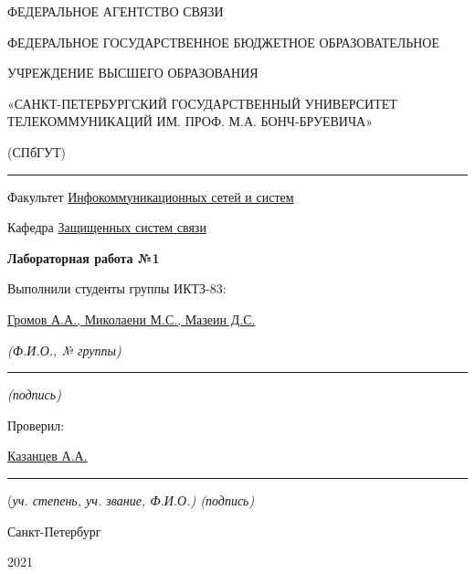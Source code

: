 \documentclass[a4paper,14pt]{extarticle}
\begin{document}
    \begin{center}
        \thispagestyle{empty}
        \begin{singlespace}
        ФЕДЕРАЛЬНОЕ АГЕНТСТВО СВЯЗИ

        ФЕДЕРАЛЬНОЕ ГОСУДАРСТВЕННОЕ БЮДЖЕТНОЕ ОБРАЗОВАТЕЛЬНОЕ

        УЧРЕЖДЕНИЕ ВЫСШЕГО ОБРАЗОВАНИЯ

        «САНКТ-ПЕТЕРБУРГСКИЙ ГОСУДАРСТВЕННЫЙ УНИВЕРСИТЕТ ТЕЛЕКОММУНИКАЦИЙ ИМ. ПРОФ. М.А. БОНЧ-БРУЕВИЧА»

        (СПбГУТ)
        \end{singlespace}
        \vspace{-1ex}
        \rule{\textwidth}{0.4pt}
        \vspace{-5ex}

        Факультет \underline{Инфокоммуникационных сетей и систем}

        Кафедра \underline{Защищенных систем связи}
        \vspace{10ex}

        \textbf{Лабораторная работа №1}\\
        


    \end{center}
    \vspace{4ex}
    \begin{flushright}
    \parbox{10 cm}{
    \begin{flushleft}
        Выполнили студенты группы ИКТЗ-83:

        \underline{Громов А.А., Миколаени М.С., Мазеин Д.С.} \hfill 

        \footnotesize \textit{ (Ф.И.О., № группы)} \hfill \rule[-0.85ex]{0.1\textwidth}{0.6pt}
        
        \hfill \textit{(подпись)} \normalsize

        Проверил:

        \underline{Казанцев А.А.} \hfill \rule[-0.85ex]{0.1\textwidth}{0.6pt}

        (\footnotesize \textit{уч. степень, уч. звание, Ф.И.О.) \hfill (подпись)} \normalsize

    \end{flushleft}
    }
    \end{flushright}
    \begin{center}
        \vfill
        Санкт-Петербург

        2021

    \end{center}
    \newpage
\end{document}
